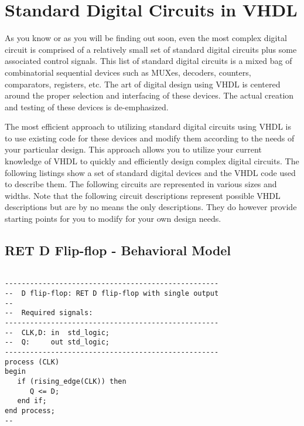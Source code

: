 %
%
\chapter{Standard Digital Circuits in VHDL}
As you know or as you will be finding out soon, even the most complex digital circuit is comprised of a relatively small set of standard digital circuits plus some associated control signals. This list of standard digital circuits is a mixed bag of combinatorial sequential devices such as MUXes, decoders, counters, comparators, registers, etc. The art of digital design using VHDL is centered around the proper selection and interfacing of these devices. The actual creation and testing of these devices is de-emphasized. 

The most efficient approach to utilizing standard digital circuits using VHDL is to use existing code for these devices and modify them according to the needs of your particular design. This approach allows you to utilize your current knowledge of VHDL to quickly and efficiently design complex digital circuits. The following listings show a set of standard digital devices and the VHDL code used to describe them. The following circuits are represented in various sizes and widths. Note that the following circuit descriptions represent possible VHDL descriptions but are by no means the only descriptions. They do however provide starting points for you to modify for your own design needs. 

\section{RET D Flip-flop - Behavioral Model}

\noindent
\begin{minipage}{0.99\linewidth}
\begin{lstlisting}

---------------------------------------------------
--  D flip-flop: RET D flip-flop with single output
--
--  Required signals: 
---------------------------------------------------
--  CLK,D: in  std_logic;
--  Q:     out std_logic;
---------------------------------------------------
process (CLK) 
begin
   if (rising_edge(CLK)) then  
      Q <= D;
   end if;
end process;
--
\end{lstlisting}
\end{minipage}

